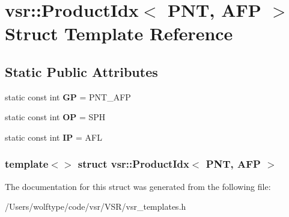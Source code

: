 \hypertarget{structvsr_1_1_product_idx_3_01_p_n_t_00_01_a_f_p_01_4}{\section{vsr\-:\-:Product\-Idx$<$ P\-N\-T, A\-F\-P $>$ Struct Template Reference}
\label{structvsr_1_1_product_idx_3_01_p_n_t_00_01_a_f_p_01_4}
}
\subsection*{Static Public Attributes}
\begin{DoxyCompactItemize}
\item 
\hypertarget{structvsr_1_1_product_idx_3_01_p_n_t_00_01_a_f_p_01_4_a8c8ce19f539b1361d6b5bb8b6dcd02cf}{static const int {\bfseries G\-P} = P\-N\-T\-\_\-\-A\-F\-P}\label{structvsr_1_1_product_idx_3_01_p_n_t_00_01_a_f_p_01_4_a8c8ce19f539b1361d6b5bb8b6dcd02cf}

\item 
\hypertarget{structvsr_1_1_product_idx_3_01_p_n_t_00_01_a_f_p_01_4_aaeaea65586453a7610726909d0844854}{static const int {\bfseries O\-P} = S\-P\-H}\label{structvsr_1_1_product_idx_3_01_p_n_t_00_01_a_f_p_01_4_aaeaea65586453a7610726909d0844854}

\item 
\hypertarget{structvsr_1_1_product_idx_3_01_p_n_t_00_01_a_f_p_01_4_a4ddf6e8d33c41c990ba52c506a2a7efc}{static const int {\bfseries I\-P} = A\-F\-L}\label{structvsr_1_1_product_idx_3_01_p_n_t_00_01_a_f_p_01_4_a4ddf6e8d33c41c990ba52c506a2a7efc}

\end{DoxyCompactItemize}
\subsubsection*{template$<$$>$ struct vsr\-::\-Product\-Idx$<$ P\-N\-T, A\-F\-P $>$}



The documentation for this struct was generated from the following file\-:\begin{DoxyCompactItemize}
\item 
/\-Users/wolftype/code/vsr/\-V\-S\-R/vsr\-\_\-templates.\-h\end{DoxyCompactItemize}
